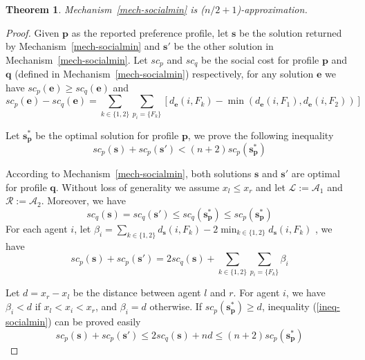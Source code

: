 \documentclass[twoside,11pt]{article}
\newtheorem{theorem}{Theorem}
\newcommand{\bd}{\mathbf}
\begin{document}
\begin{theorem}\label{min-social-upper}
Mechanism~\ref{mech-socialmin} is ($n/2+1$)-approximation.
\end{theorem}
\begin{proof}
Given $\bd{p}$ as the reported preference profile, let $\bd{s}$ be the solution returned by Mechanism~\ref{mech-socialmin} and $\bd{s'}$ be the other solution in Mechanism~\ref{mech-socialmin}. Let $sc_p$ and $sc_q$ be the social cost for profile $\bd{p}$ and $\bd{q}$ (defined in Mechanism~\ref{mech-socialmin}) respectively, for any solution $\bd{e}$ we have $sc_p(\bd{e}) \geq sc_q(\bd{e})$ and
$$sc_p (\bd{e}) - sc_q (\bd{e}) =
\sum_{k \in \{1,2\}} \sum_{p_{i} = \{F_k\}} [d_{\bd{e}} (i, F_{k}) - \min (d_{\bd{e}} (i, F_{1}), d_{\bd{e}} (i, F_{2}))]$$

\noindent Let $\bd{s_p^*}$ be the optimal solution for profile $\bd{p}$, we prove the following inequality
\begin{equation}\label{ineq-socialmin}
sc_p (\bd{s}) + sc_p (\bd{s'})< (n+2)sc_p (\bd{s_p^*})
\end{equation}

\noindent According to Mechanism~\ref{mech-socialmin}, both solutions $\bd{s}$ and $\bd{s'}$ are optimal for profile $\bd{q}$.
Without loss of generality we assume $x_l \le x_r$ and let $\mathcal{L} := \mathcal{A}_1$ and $\mathcal{R} := \mathcal{A}_2$. Moreover, we have
\begin{equation}\label{ineq-optrs}
sc_q (\bd{s})=sc_q (\bd{s'}) \leq sc_q (\bd{s_p^*}) \leq sc_p(\bd{s_p^*})
\end{equation}
%
\noindent
For each agent $i$, let
$\beta_i = \sum_{k \in \{1, 2\}} d_{\bd{s}} (i, F_{k})-2\min_{k \in \{1, 2\}} d_{\bd{s}} (i, F_{k})$
, we have
$$sc_p (\bd{s}) + sc_p (\bd{s'}) =
2sc_q (\bd{s}) + \sum_{k \in \{1,2\}} \sum_{p_{i} = \{F_k\}}\beta_i$$


\noindent Let $d= x_r-x_l$ be the distance between agent $l$ and $r$. For agent $i$, we have $\beta_i < d$ if $x_l < x_i < x_r$, and $\beta_i = d$ otherwise.
%
If $sc_p (\bd{s_p^*}) \geq d$,  inequality (\ref{ineq-socialmin}) can be proved easily
$$sc_p (\bd{s}) + sc_p (\bd{s'}) \le 2sc_q (\bd{s}) + n d \le (n+2)sc_p (\bd{s_p^*})$$


\end{proof}
\end{document}
